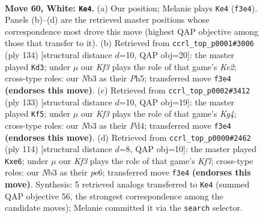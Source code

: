 \documentclass[11pt]{article}
\begin{document}
\clearpage

\begin{figure}[p]\centering
\begin{subfigure}{0.46\textwidth}\centering
\resizebox{\linewidth}{!}{%
\newchessgame
\chessboard[
  setfen={7k/2P5/2r5/8/5B2/1N3K2/8/8 w - - 33 60},
  showmover=false,
  pgfstyle=straightmove, color=movearrow, markmove={f3-e4}
]}
\caption{}
\end{subfigure}\hfill
\begin{subfigure}{0.46\textwidth}\centering
\resizebox{\linewidth}{!}{%
\newchessgame
\chessboard[
  setfen={8/1B6/2P5/2r4P/8/6k1/4K3/8 w - - 3 68},
  showmover=false,
  pgfstyle=straightmove, color=movearrow, markmove={e2-d3}
]}
\caption{}
\end{subfigure}
\\[4pt]
\begin{subfigure}{0.46\textwidth}\centering
\resizebox{\linewidth}{!}{%
\newchessgame
\chessboard[
  setfen={1b6/8/8/6k1/3p4/5K2/7p/7R b - - 7 67},
  showmover=false,
  pgfstyle=straightmove, color=movearrow, markmove={g5-f5}
]}
\caption{}
\end{subfigure}\hfill
\begin{subfigure}{0.46\textwidth}\centering
\resizebox{\linewidth}{!}{%
\newchessgame
\chessboard[
  setfen={8/1k3KP1/4pB2/8/6r1/8/8/8 w - - 1 58},
  showmover=false,
  pgfstyle=straightmove, color=movearrow, markmove={f7-e6}
]}
\caption{}
\end{subfigure}
\caption{\textbf{Move 60, White: \texttt{Ke4}.} (a) Our position; Melanie plays \texttt{Ke4} (\texttt{f3e4}). Panels (b)--(d) are the retrieved master positions whose correspondence most drove this move (highest QAP objective among those that transfer to it). (b) Retrieved from \texttt{ccrl\_top\_p0001\#3006} (ply 134) [structural distance $d$=10, QAP obj=20]: the master played \texttt{Kd3}; under $\mu$ our \emph{Kf3} plays the role of that game's \emph{Ke2}; cross-type roles: our \emph{N}b3 as their \emph{P}h5; transferred move \texttt{f3e4} \textbf{(endorses this move)}. (c) Retrieved from \texttt{ccrl\_top\_p0002\#3412} (ply 133) [structural distance $d$=10, QAP obj=19]: the master played \texttt{Kf5}; under $\mu$ our \emph{Kf3} plays the role of that game's \emph{Kg4}; cross-type roles: our \emph{N}b3 as their \emph{P}d4; transferred move \texttt{f3e4} \textbf{(endorses this move)}. (d) Retrieved from \texttt{ccrl\_top\_p0000\#2462} (ply 114) [structural distance $d$=8, QAP obj=10]: the master played \texttt{Kxe6}; under $\mu$ our \emph{Kf3} plays the role of that game's \emph{Kf7}; cross-type roles: our \emph{N}b3 as their \emph{p}e6; transferred move \texttt{f3e4} \textbf{(endorses this move)}. Synthesis: 5 retrieved analogs transferred to \texttt{Ke4} (summed QAP objective 56, the strongest correspondence among the candidate moves); Melanie committed it via the \texttt{search} selector.}
\label{fig:thought-m118}
\end{figure}
\end{document}
